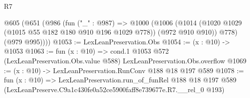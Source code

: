 \begin{lexlean}{R7}
\begin{coremodule}
  @605
    (@651
      (@986
        (fun ("_" : @987) =>
        @1000
          (@1006
            (@1014 (@1020 @1029 (@1015 @55 @182 @180 @910 @196 @1029 @778)) (@972 @910 @910))
            @778)
          (@979 @995))))
@1053 := LexLeanPreservation.Obs
@1054 := (x : @10) -> @1053
@1063 := fun (x : @10) =>
  cond.{1} @1053 @572 (LexLeanPreservation.Obs.value @588) LexLeanPreservation.Obs.overflow
@1069 := (x : @10) -> LexLeanPreservation.RunConv @188 @18 @197 @589
@1078 := fun (x : @10) =>
  LexLeanPreservation.run_of_funRel
    @188
    @18
    @197
    @589
    (LexLeanPreserve.C9a1c430fe0a52ce5900faff8e739677e.R7.__rel_0 @193)
\end{coremodule}
\end{lexlean}
